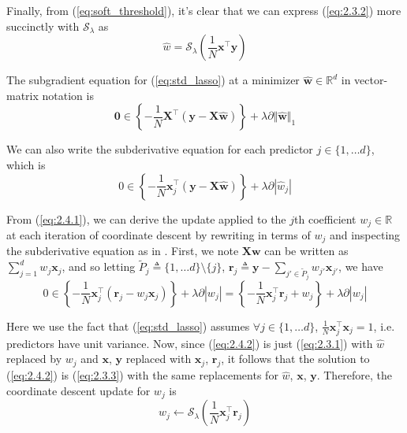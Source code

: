 \documentclass{article}
\numberwithin{equation}{section}
\begin{document}
Finally, from (\ref{eq:soft_threshold}), it's clear that we can express
(\ref{eq:2.3.2}) more succinctly with $ \mathcal{S}_\lambda $ as
\begin{equation} \label{eq:2.3.3}
    \hat{w} =
    \mathcal{S}_\lambda\left(\frac{1}{N}\mathbf{x}^\top\mathbf{y}\right)
\end{equation}


The subgradient equation for (\ref{eq:std_lasso}) at a minimizer
$ \mathbf{\hat{w}} \in \mathbb{R}^d $ in vector-matrix notation is
\begin{equation*}
    \mathbf{0} \in \left\{
        -\frac{1}{N}\mathbf{X}^\top(\mathbf{y} - \mathbf{X}\hat{\mathbf{w}})
    \right\} +
    \lambda\partial\Vert\hat{\mathbf{w}}\Vert_1
\end{equation*}

We can also write the subderivative equation for each predictor $ j \in
\{1, \ldots d\} $, which is
\begin{equation} \label{eq:2.4.1}
    0 \in \left\{
        -\frac{1}{N}\mathbf{x}_j^\top(\mathbf{y} - \mathbf{X}\hat{\mathbf{w}})
    \right\} +
    \lambda\partial|\hat{w}_j|
\end{equation}

From (\ref{eq:2.4.1}), we can derive the update applied to the $ j $th
coefficient $ w_j \in \mathbb{R} $ at each iteration of coordinate descent
by rewriting in terms of $ w_j $ and inspecting the subderivative equation
as in . First, we note $ \mathbf{X}\mathbf{w} $ can be
written as $ \sum_{j = 1}^dw_j\mathbf{x}_j $, and so letting
$ \tilde{P}_j \triangleq\{1, \ldots d\} \setminus \{j\} $,
$ \mathbf{r}_j \triangleq \mathbf{y} -
\sum_{j' \in \tilde{P}_j}w_{j'}\mathbf{x}_{j'} $, we have
\begin{equation} \label{eq:2.4.2}
    0 \in \left\{
        -\frac{1}{N}\mathbf{x}_j^\top(\mathbf{r}_j - w_j\mathbf{x}_j)
    \right\} +
    \lambda\partial|w_j| =
    \left\{-\frac{1}{N}\mathbf{x}_j^\top\mathbf{r}_j + w_j\right\} +
    \lambda\partial|w_j|
\end{equation}

Here we use the fact that (\ref{eq:std_lasso}) assumes $ \forall j \in
\{1, \ldots d\} $, $ \frac{1}{N}\mathbf{x}_j^\top\mathbf{x}_j = 1 $, i.e.
predictors have unit variance. Now, since (\ref{eq:2.4.2}) is just
(\ref{eq:2.3.1}) with $ \hat{w} $ replaced by $ w_j $ and $ \mathbf{x} $,
$ \mathbf{y} $ replaced with $ \mathbf{x}_j $, $ \mathbf{r}_j $, it follows
that the solution to (\ref{eq:2.4.2}) is (\ref{eq:2.3.3}) with the same
replacements for $ \hat{w} $, $ \mathbf{x} $, $ \mathbf{y} $. Therefore, the
coordinate descent update for $ w_j $ is
\begin{equation} \label{eq:2.4.3}
    w_j \leftarrow \mathcal{S}_\lambda\left(
        \frac{1}{N}\mathbf{x}_j^\top\mathbf{r}_j
    \right)
\end{equation}
\end{document}
